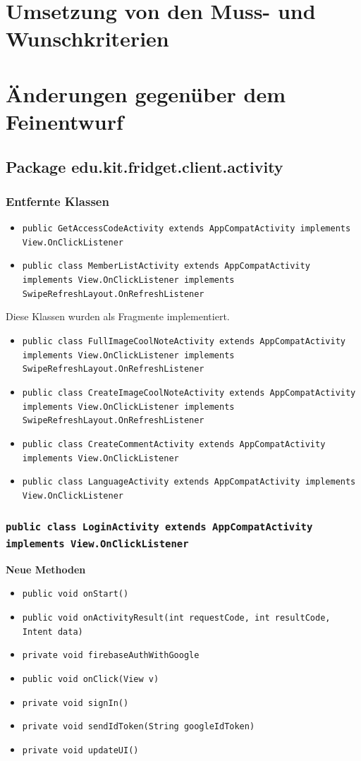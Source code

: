 \documentclass[a4paper]{scrreprt}
\begin{document}
	\chapter{Umsetzung von den Muss- und Wunschkriterien}
	
	\chapter{Änderungen gegenüber dem Feinentwurf}
	\section{Package edu.kit.fridget.client.activity}
	\subsection{Entfernte Klassen}
		\begin{itemize}
			\item \texttt{public GetAccessCodeActivity extends AppCompatActivity implements View.OnClickListener}
			\item \texttt{public class MemberListActivity extends AppCompatActivity implements View.OnClickListener implements SwipeRefreshLayout.OnRefreshListener}
		\end{itemize}
			Diese Klassen wurden als Fragmente implementiert.
		\begin{itemize}
			\item \texttt{public class FullImageCoolNoteActivity extends AppCompatActivity implements View.OnClickListener implements SwipeRefreshLayout.OnRefreshListener}
			\item \texttt{public class CreateImageCoolNoteActivity extends AppCompatActivity implements View.OnClickListener implements SwipeRefreshLayout.OnRefreshListener}
			\item \texttt{public class CreateCommentActivity extends AppCompatActivity implements View.OnClickListener}
			\item \texttt{public class LanguageActivity extends AppCompatActivity implements View.OnClickListener}
		\end{itemize}
	
	\subsection{\texttt{public class LoginActivity extends AppCompatActivity implements View.OnClickListener}}
		\textbf{Neue Methoden}
			\begin{itemize}
				\item \texttt{public void onStart()}
				\item \texttt{public void onActivityResult(int requestCode, int resultCode, Intent data)}
				\item \texttt{private void firebaseAuthWithGoogle}
				\item \texttt{public void onClick(View v)}
				\item \texttt{private void signIn()}
				\item \texttt{private void sendIdToken(String googleIdToken)}
				\item \texttt{private void updateUI()}
			\end{itemize}
\end{document}
